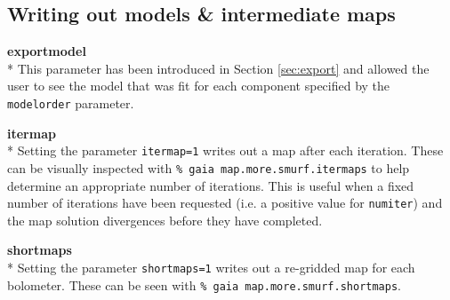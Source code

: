 \documentclass[twoside,11pt]{article}
\newcommand{\xlabel}[1]{}
\renewcommand{\_}{\texttt{\symbol{95}}}
\begin{document}
\subsection{\xlabel{inter}Writing out models \& intermediate maps}
\textbf{exportmodel}\\*
This parameter has been introduced in Section \ref{sec:export} and allowed the user to see the model that was fit for each component specified by the \texttt{modelorder} parameter. 

\textbf{itermap}\\*
Setting the parameter \texttt{itermap=1} writes out a map after each iteration. These can be  visually inspected with \texttt{\% gaia map.more.smurf.itermaps} to help determine an appropriate number of iterations. This is useful when a fixed number of iterations have been requested  (i.e. a positive value for \texttt{numiter}) and the map solution divergences before they have completed.

\textbf{shortmaps}\\*
Setting the parameter \texttt{shortmaps=1} writes out a re-gridded map for each bolometer. These can be seen with \texttt{\% gaia map.more.smurf.shortmaps}.
\end{document}

